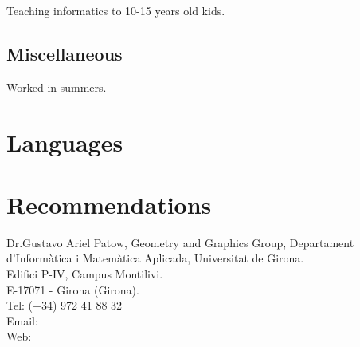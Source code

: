 {
    Teaching informatics to 10-15 years old kids.
}


\subsection{Miscellaneous}

{
    Worked in summers.
}


\section{Languages}



\section{Recommendations}
    {
        Dr.Gustavo Ariel Patow, Geometry and Graphics Group, Departament d'Inform\`atica i Matem\`atica Aplicada, Universitat de Girona. \\
        Edifici P-IV, Campus Montilivi. \\
        E-17071 - Girona (Girona). \\
        Tel: (+34) 972 41 88 32 \\
        Email:  \\
        Web: 
    }

% 
% 
% 
     
